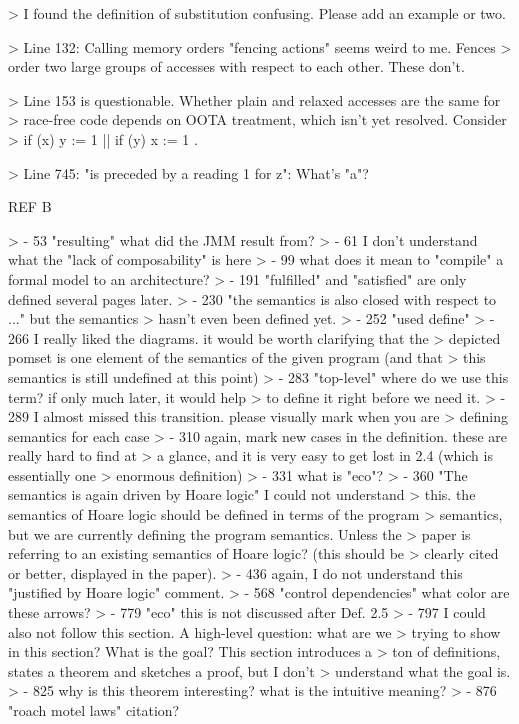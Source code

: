 \documentclass[acmsmall,review,anonymous,screen]{acmart}\settopmatter{printfolios=true}
\theoremstyle{acmdefinition}
\begin{document}
> I found the definition of substitution confusing. Please add an example or two.

> Line 132: Calling memory orders "fencing actions" seems weird to me. Fences
> order two large groups of accesses with respect to each other. These don't.  

> Line 153 is questionable. Whether plain and relaxed accesses are the same for
> race-free code depends on OOTA treatment, which isn't yet resolved. Consider
> if (x) y := 1 || if (y) x := 1 . 

> Line 745: "is preceded by a reading 1 for z": What's "a"?


REF B

> - 53 "resulting" what did the JMM result from?
> - 61 I don't understand what the "lack of composability" is here
> - 99 what does it mean to "compile" a formal model to an architecture?
> - 191 "fulfilled" and "satisfied" are only defined several pages later.
> - 230 "the semantics is also closed with respect to ..." but the semantics
>   hasn't even been defined yet.
> - 252 "used define"
> - 266 I really liked the diagrams. it would be worth clarifying that the
>   depicted pomset is one element of the semantics of the given program (and that
>   this semantics is still undefined at this point)
> - 283 "top-level" where do we use this term? if only much later, it would help
>   to define it right before we need it.
> - 289 I almost missed this transition. please visually mark when you are
>   defining semantics for each case
> - 310 again, mark new cases in the definition. these are really hard to find at
>   a glance, and it is very easy to get lost in 2.4 (which is essentially one
>   enormous definition)
> - 331 what is "eco"?
> - 360 "The semantics is again driven by Hoare logic" I could not understand
>   this. the semantics of Hoare logic should be defined in terms of the program
>   semantics, but we are currently defining the program semantics. Unless the
>   paper is referring to an existing semantics of Hoare logic? (this should be
>   clearly cited or better, displayed in the paper).
> - 436 again, I do not understand this "justified by Hoare logic" comment.
> - 568 "control dependencies" what color are these arrows?
> - 779 "eco" this is not discussed after Def. 2.5
> - 797 I could also not follow this section. A high-level question: what are we
>   trying to show in this section? What is the goal? This section introduces a
>   ton of definitions, states a theorem and sketches a proof, but I don't
>   understand what the goal is.
> - 825 why is this theorem interesting? what is the intuitive meaning?
> - 876 "roach motel laws" citation?
\end{document}
